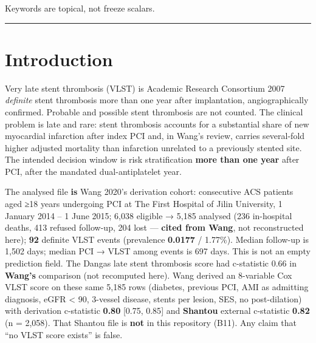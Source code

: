 \documentclass[
]{article}
\begin{document}
Keywords are topical, not freeze scalars.

\begin{center}\rule{0.5\linewidth}{0.5pt}\end{center}

\section{Introduction}\label{introduction}

Very late stent thrombosis (VLST) is Academic Research Consortium 2007
\emph{definite} stent thrombosis more than one year after implantation,
angiographically confirmed. Probable and possible stent thrombosis are
not counted. The clinical problem is late and rare: stent thrombosis
accounts for a substantial share of new myocardial infarction after
index PCI and, in Wang's review, carries several-fold higher adjusted
mortality than infarction unrelated to a previously stented site. The
intended decision window is risk stratification \textbf{more than one
year} after PCI, after the mandated dual-antiplatelet year.

The analysed file \textbf{is} Wang 2020's derivation cohort: consecutive
ACS patients aged ≥18 years undergoing PCI at The First Hospital of
Jilin University, 1 January 2014 -- 1 June 2015; 6,038 eligible → 5,185
analysed (236 in-hospital deaths, 413 refused follow-up, 204 lost ---
\textbf{cited from Wang}, not reconstructed here); \textbf{92} definite
VLST events (prevalence \textbf{0.0177} / 1.77\%). Median follow-up is
1,502 days; median PCI → VLST among events is 697 days. This is not an
empty prediction field. The Dangas late stent thrombosis score had
c-statistic 0.66 in \textbf{Wang's} comparison (not recomputed here).
Wang derived an 8-variable Cox VLST score on these same 5,185 rows
(diabetes, previous PCI, AMI as admitting diagnosis, eGFR \textless{}
90, 3-vessel disease, stents per lesion, SES, no post-dilation) with
derivation c-statistic \textbf{0.80} {[}0.75, 0.85{]} and
\textbf{Shantou} external c-statistic \textbf{0.82} (n = 2,058). That
Shantou file is \textbf{not} in this repository (B11). Any claim that
``no VLST score exists'' is false.
\end{document}
